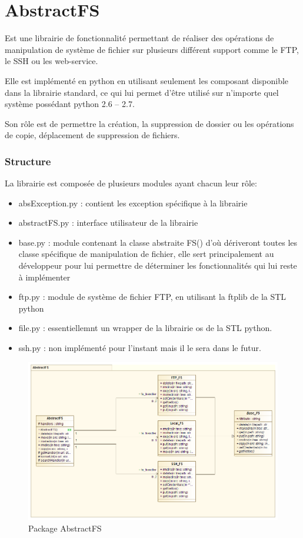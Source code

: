 \part*{AbstractFS}
Est une librairie de fonctionnalité  permettant de réaliser des opérations de manipulation de système de fichier sur plusieurs différent support comme le FTP, le SSH ou les web-service.

Elle est implémenté en python en utilisant seulement les composant disponible dans la librairie standard, ce qui lui permet d'être utilisé sur n'importe quel système possédant python 2.6 – 2.7.

Son rôle est de permettre la création, la suppression de dossier ou les opérations de copie, déplacement de suppression de fichiers.

\section*{Structure}
La librairie est composée de plusieurs modules ayant chacun leur rôle:

\begin{itemize}
\item absException.py : contient les exception spécifique à la librairie
\item abstractFS.py : interface utilisateur de la librairie
\item base.py : module contenant la classe abstraite FS() d'où dériveront toutes les classe spécifique de manipulation de fichier, elle sert principalement au développeur pour lui permettre de déterminer les fonctionnalités qui lui reste à implémenter
\item ftp.py : module de système de fichier FTP, en utilisant la ftplib de la STL python
\item file.py : essentiellemnt un wrapper de la librairie os de la STL python.
\item ssh.py : non implémenté pour l'instant mais il le sera dans le futur.
\end{itemize}

\begin{figure}[h!]
	\centering
	\includegraphics[scale=0.35]{images/package_abstract_fs.png}
	\caption{Package AbstractFS}
\end{figure}

